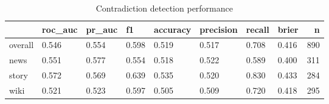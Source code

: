 \begin{table}
\caption{Contradiction detection performance}
\label{tab:results}
\begin{tabular}{llllllllr}
\toprule
 & roc_auc & pr_auc & f1 & accuracy & precision & recall & brier & n \\
\midrule
overall & 0.546 & 0.554 & 0.598 & 0.519 & 0.517 & 0.708 & 0.416 & 890 \\
news & 0.551 & 0.577 & 0.554 & 0.518 & 0.522 & 0.589 & 0.400 & 311 \\
story & 0.572 & 0.569 & 0.639 & 0.535 & 0.520 & 0.830 & 0.433 & 284 \\
wiki & 0.521 & 0.523 & 0.597 & 0.505 & 0.509 & 0.720 & 0.418 & 295 \\
\bottomrule
\end{tabular}
\end{table}
